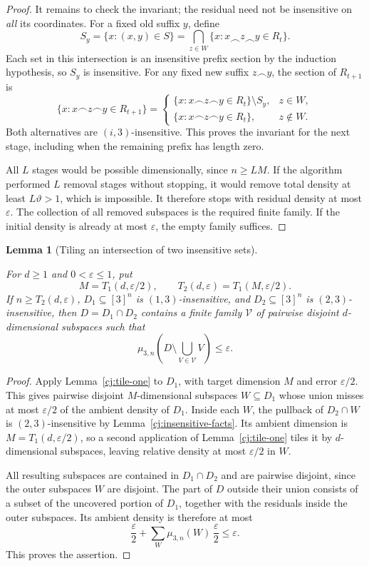 \documentclass[11pt]{amsart}
\newtheorem{lemma}[theorem]{Lemma}
\theoremstyle{definition}
\theoremstyle{remark}
\numberwithin{equation}{section}
\providecommand{\lean}[1]{}
\providecommand{\leanok}{}
\begin{document}
\begin{proof}
It remains to check the invariant; the residual need not be
insensitive on \emph{all} its coordinates.  For a fixed old suffix
$y$, define
\[
 S_y=\{x:(x,y)\in S\}
 =\bigcap_{z\in W}\{x:x\frown z\frown y\in R_t\}.
\]
Each set in this intersection is an insensitive prefix section by
the induction hypothesis, so $S_y$ is insensitive.  For any fixed
new suffix $z\frown y$, the section of $R_{t+1}$ is
\[
 \{x:x\frown z\frown y\in R_{t+1}\}
 =\begin{cases}
   \{x:x\frown z\frown y\in R_t\}\setminus S_y,&z\in W,\\
   \{x:x\frown z\frown y\in R_t\},&z\notin W.
  \end{cases}
\]
Both alternatives are $(i,3)$-insensitive.  This proves the invariant
for the next stage, including when the remaining prefix has length
zero.

All $L$ stages would be possible dimensionally, since $n\ge LM$.
If the algorithm performed $L$ removal stages without stopping, it
would remove total density at least $L\vartheta>1$, which is
impossible.  It therefore stops with residual density at most
$\varepsilon$.  The collection of all removed subspaces is the
required finite family.  If the initial density is already at most
$\varepsilon$, the empty family suffices.
\end{proof}

\begin{lemma}[Tiling an intersection of two insensitive sets]\label{cj:tile-two}
\lean{Auto.C_cj_tile_two,Auto.cj_tile_two}
\leanok
For $d\ge1$ and $0<\varepsilon\le1$, put
\[
 M=T_1(d,\varepsilon/2),\qquad
 T_2(d,\varepsilon)=T_1(M,\varepsilon/2).
\]
If $n\ge T_2(d,\varepsilon)$, $D_1\subseteq[3]^n$ is
$(1,3)$-insensitive, and $D_2\subseteq[3]^n$ is
$(2,3)$-insensitive, then $D=D_1\cap D_2$ contains a finite family
$\mathcal V$ of pairwise disjoint $d$-dimensional subspaces such that
\[
 \mu_{3,n}\left(D\setminus\bigcup_{V\in\mathcal V}V\right)
 \le\varepsilon.
\]
\end{lemma}
\begin{proof}
Apply Lemma~\ref{cj:tile-one} to $D_1$, with target dimension $M$
and error $\varepsilon/2$.  This gives pairwise disjoint
$M$-dimensional subspaces $W\subseteq D_1$ whose union misses at
most $\varepsilon/2$ of the ambient density of $D_1$.
Inside each $W$, the pullback of $D_2\cap W$ is
$(2,3)$-insensitive by Lemma~\ref{cj:insensitive-facts}.
Its ambient dimension is $M=T_1(d,\varepsilon/2)$, so a second
application of Lemma~\ref{cj:tile-one} tiles it by $d$-dimensional
subspaces, leaving relative density at most $\varepsilon/2$ in $W$.

All resulting subspaces are contained in $D_1\cap D_2$ and are
pairwise disjoint, since the outer subspaces $W$ are disjoint.
The part of $D$ outside their union consists of a subset of the
uncovered portion of $D_1$, together with the residuals inside the
outer subspaces.  Its ambient density is therefore at most
\[
 \frac{\varepsilon}{2}
 +\sum_W\mu_{3,n}(W)\,\frac{\varepsilon}{2}
 \le\varepsilon.
\]
This proves the assertion.
\end{proof}
\end{document}
